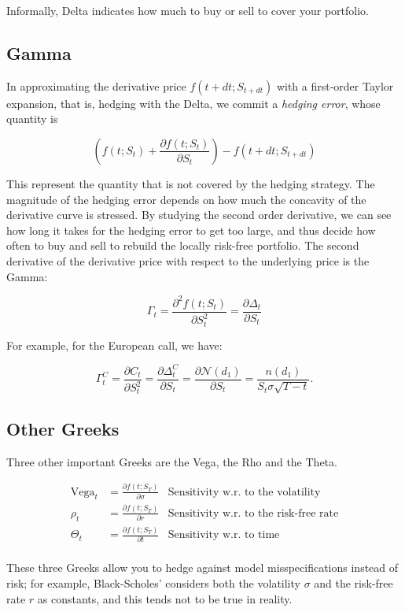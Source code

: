 \documentclass[oneside,titlepage,headinclude,12pt,a4paper,BCOR5mm,footinclude]{book}
\theoremstyle{defn}
\newcommand\NN{\mathcal{N}}
\newcommand\de\partial
\begin{document}
Informally, Delta indicates how much to buy or sell to cover your portfolio.

\subsection{Gamma}

In  approximating the  derivative  price $f(t+dt;S_{t+dt})$  with a  first-order
Taylor expansion, that  is, hedging with the Delta, we  commit a \textit{hedging
error}, whose quantity is

\[
  \left(f(t;S_t) + \frac{\de f(t;S_t)}{\de S_t}\right) - f(t+dt;S_{t+dt}) 
\]

This represent  the quantity that  is not covered  by the hedging  strategy. The
magnitude  of  the hedging  error  depends  on how  much  the  concavity of  the
derivative curve  is stressed. By studying  the second order derivative,  we can
see how long  it takes for the hedging  error to get too large,  and thus decide
how often to buy and sell to rebuild the locally risk-free portfolio. The second
derivative of the  derivative price with respect to the  underlying price is the
Gamma:

\[
  \Gamma_t = \frac{\de^2 f(t;S_t)}{\de S_t^2} = \frac{\de \Delta_t}{\de S_t}
\]

For example, for the European call, we have:

\[
  \Gamma^C_t = \frac{\de C_t}{\de S_t^2} = \frac{\de \Delta^C_t}{\de S_t} = \frac{\de \NN(d_1)}{\de S_t} =
  \frac{n(d_1)}{S_t\sigma\sqrt{T-t}}.
\]

\subsection{Other Greeks}

Three other important Greeks are the Vega, the Rho and the Theta.

\[
  \begin{array}{rlr}
    \text{Vega}_t &= \frac{\de f(t;S_T)}{\de \sigma} & \text{Sensitivity w.r. to the volatility} \\
    \rho_t &= \frac{\de f(t;S_T)}{\de r} & \text{Sensitivity w.r. to the risk-free rate} \\
    \Theta_t &= \frac{\de f(t;S_T)}{\de t} & \text{Sensitivity w.r. to time} \\
  \end{array}
\]

These three Greeks allow you to hedge against model misspecifications instead of
risk; for example, Black-Scholes' considers both the volatility $\sigma$ and the
risk-free rate $r$ as constants, and this tends not to be true in reality.
\end{document}
